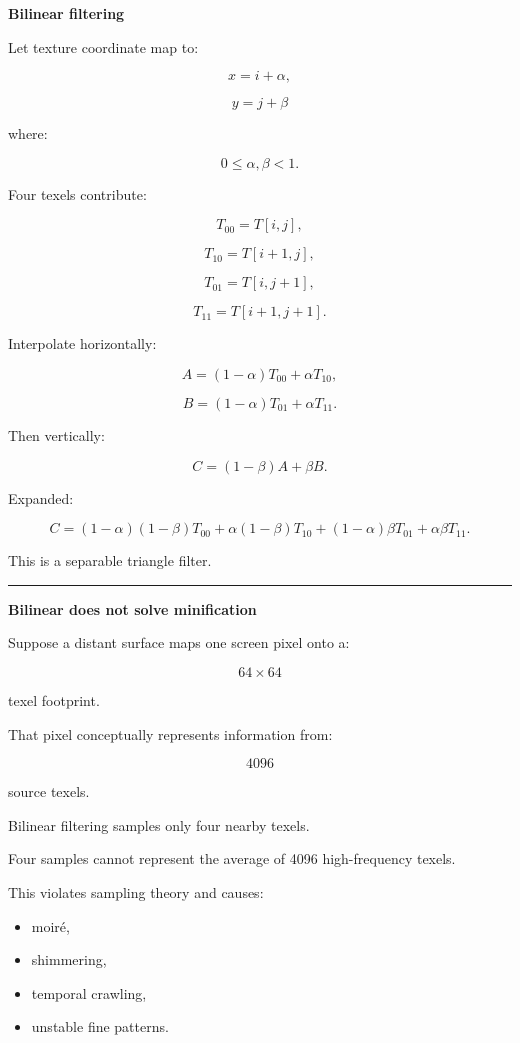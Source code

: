 \textbf{Bilinear filtering}

Let texture coordinate map to:

\[
x=i+\alpha,
\]

\[
y=j+\beta
\]

where:

\[
0\le\alpha,\beta<1.
\]

Four texels contribute:

\[
T_{00}=T[i,j],
\]

\[
T_{10}=T[i+1,j],
\]

\[
T_{01}=T[i,j+1],
\]

\[
T_{11}=T[i+1,j+1].
\]

Interpolate horizontally:

\[
A=(1-\alpha)T_{00}+\alpha T_{10},
\]

\[
B=(1-\alpha)T_{01}+\alpha T_{11}.
\]

Then vertically:

\[
\boxed{
C=(1-\beta)A+\beta B.
}
\]

Expanded:

\[
C=
(1-\alpha)(1-\beta)T_{00}
+
\alpha(1-\beta)T_{10}
+
(1-\alpha)\beta T_{01}
+
\alpha\beta T_{11}.
\]

This is a separable triangle filter.

\begin{center}\rule{0.5\linewidth}{0.5pt}\end{center}

\textbf{Bilinear does not solve minification}

Suppose a distant surface maps one screen pixel onto a:

\[
64\times64
\]

texel footprint.

That pixel conceptually represents information from:

\[
4096
\]

source texels.

Bilinear filtering samples only four nearby texels.

Four samples cannot represent the average of 4096 high-frequency texels.

This violates sampling theory and causes:

\begin{itemize}
\tightlist
\item
  moiré,
\item
  shimmering,
\item
  temporal crawling,
\item
  unstable fine patterns.
\end{itemize}

